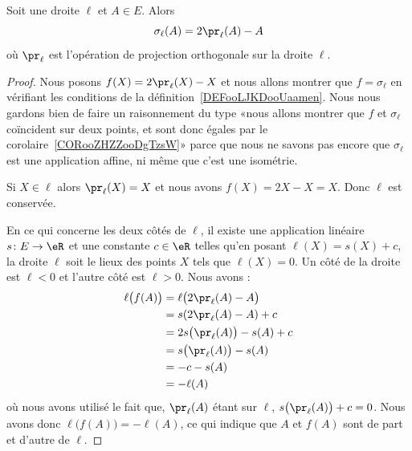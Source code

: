 \begin{lemma}       \label{LEMooZSDRooUkNYer}
	Soit une droite \( \ell\) et \( A\in E\). Alors
	\begin{equation}        \label{EQooVUQDooKuwszl}
		\sigma_{\ell}(A)=2\pr_{\ell}(A)-A
	\end{equation}
	où \( \pr_{\ell}\) est l'opération de projection orthogonale sur la droite \( \ell\).
\end{lemma}

\begin{proof}
	Nous posons \( f(X)=2\pr_{\ell}(X)-X\) et nous allons montrer que \( f=\sigma_{\ell}\) en vérifiant les conditions de la définition~\ref{DEFooLJKDooUaamen}.
	Nous nous gardons bien de faire un raisonnement du type «nous allons montrer que \( f\) et \( \sigma_{\ell}\) coïncident sur deux points, et sont donc égales par le corolaire~\ref{CORooZHZZooDgTzsW}» parce que nous ne savons pas encore que \( \sigma_{\ell}\) est une application affine, ni même que c'est une isométrie.

	Si \( X\in\ell\) alors \( \pr_{\ell}(X)=X\) et nous avons \( f(X)=2X-X=X\). Donc \( \ell\) est conservée.

	En ce qui concerne les deux côtés de \( \ell\), il existe une application linéaire \( s\colon E\to \eR\) et une constante \( c\in \eR\) telles qu'en posant \( \ell(X)=s(X)+c\), la droite \( \ell\) soit le lieux des points \( X\) tels que \( \ell(X)=0\). Un côté de la droite est \( \ell<0\) et l'autre côté est \( \ell>0\). Nous avons :
	\begin{subequations}
		\begin{align}
			\ell\big( f(A) \big) & =\ell\big( 2\pr_{\ell}(A)-A \big)   \\
			                     & =s(2\pr_{\ell}(A)-A)+c              \\
			                     & =2s\big( \pr_{\ell}(A) \big)-s(A)+c \\
			                     & =s\big( \pr_{\ell}(A) \big)-s(A)    \\
			                     & =-c-s(A)                            \\
			                     & =-\ell(A)
		\end{align}
	\end{subequations}
	où nous avons utilisé le fait que, \( \pr_{\ell}(A)\) étant sur \( \ell\), \( s\big( \pr_{\ell}(A) \big)+c=0\). Nous avons donc \( \ell\big( f(A) \big)=-\ell(A)\), ce qui indique que \( A\) et \( f(A)\) sont de part et d'autre de \( \ell\).


\end{proof}
